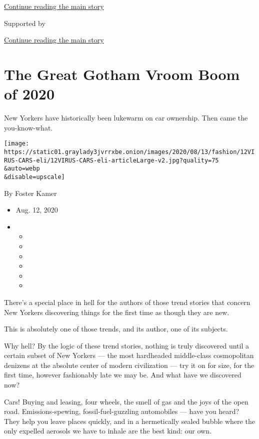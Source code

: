 \protect\hyperlink{after-top}{Continue reading the main story}

Supported by

\protect\hyperlink{after-sponsor}{Continue reading the main story}

\hypertarget{the-great-gotham-vroom-boom-of-2020}{%
\section{The Great Gotham Vroom Boom of
2020}\label{the-great-gotham-vroom-boom-of-2020}}

New Yorkers have historically been lukewarm on car ownership. Then came
the you-know-what.

\texttt{[image: https://static01.graylady3jvrrxbe.onion/images/2020/08/13/fashion/12VIRUS-CARS-eli/12VIRUS-CARS-eli-articleLarge-v2.jpg?quality=75\\\&auto=webp\\\&disable=upscale]}

By Foster Kamer

\begin{itemize}
\item
  Aug. 12, 2020
\item
  \begin{itemize}
  \item
  \item
  \item
  \item
  \item
  \item
  \end{itemize}
\end{itemize}

There's a special place in hell for the authors of those trend stories
that concern New Yorkers discovering things for the first time as though
they are new.

This is absolutely one of those trends, and its author, one of its
subjects.

Why hell? By the logic of these trend stories, nothing is truly
discovered until a certain subset of New Yorkers --- the most hardheaded
middle-class cosmopolitan denizens at the absolute center of modern
civilization --- try it on for size, for the first time, however
fashionably late we may be. And what have we discovered now?

Cars! Buying and leasing, four wheels, the smell of gas and the joys of
the open road. Emissions-spewing, fossil-fuel-guzzling automobiles ---
have you heard? They help you leave places quickly, and in a
hermetically sealed bubble where the only expelled aerosols we have to
inhale are the best kind: our own.

